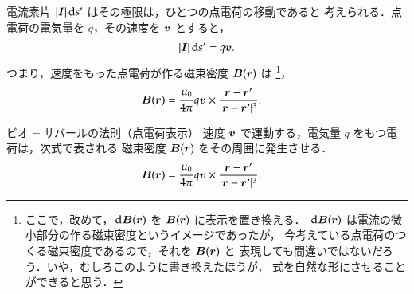         電流素片 $|\boldsymbol{I}| \,\mathrm{d} s'$ はその極限は，ひとつの点電荷の移動であると
        考えられる．点電荷の電気量を $q$，その速度を $\boldsymbol{v}$ とすると，
        \begin{align*}
            |\boldsymbol{I}| \,\mathrm{d} s' = q\boldsymbol{v}.
        \end{align*}
        つまり，速度をもった点電荷が作る磁束密度 $\boldsymbol{B}(\boldsymbol{r})$ は
            \footnote{
                ここで，改めて，$\,\mathrm{d} \boldsymbol{B}(\boldsymbol{r})$ を $\boldsymbol{B}(\boldsymbol{r})$ に表示を置き換える．
                $\,\mathrm{d} \boldsymbol{B}(\boldsymbol{r})$ は電流の微小部分の作る磁束密度というイメージであったが，
                今考えている点電荷のつくる磁束密度であるので，それを $\boldsymbol{B}(\boldsymbol{r})$ と
                表現しても間違いではないだろう．いや，むしろこのように書き換えたほうが，
                式を自然な形にさせることができると思う．
            }，
        \begin{align*}
            \boldsymbol{B}(\boldsymbol{r})
            &=\frac{\mu_{0}}{4\pi}q\boldsymbol{v} \times
             \frac{\boldsymbol{r}-\boldsymbol{r}'}{|\boldsymbol{r}-\boldsymbol{r}'|^{3}}.
        \end{align*}
        \begin{myshadebox}{ビオ$=$サバールの法則（点電荷表示）}
            速度 $\boldsymbol{v}$ で運動する，電気量 $q$ をもつ電荷は，次式で表される
            磁束密度 $\boldsymbol{B}(\boldsymbol{r})$ をその周囲に発生させる．
            \begin{align}
                \boldsymbol{B}(\boldsymbol{r})
                 &=\frac{\mu_{0}}{4\pi}q\boldsymbol{v} \times
                  \frac{\boldsymbol{r}-\boldsymbol{r}'}{|\boldsymbol{r}-\boldsymbol{r}'|^{3}}.
            \end{align}
        \end{myshadebox}

